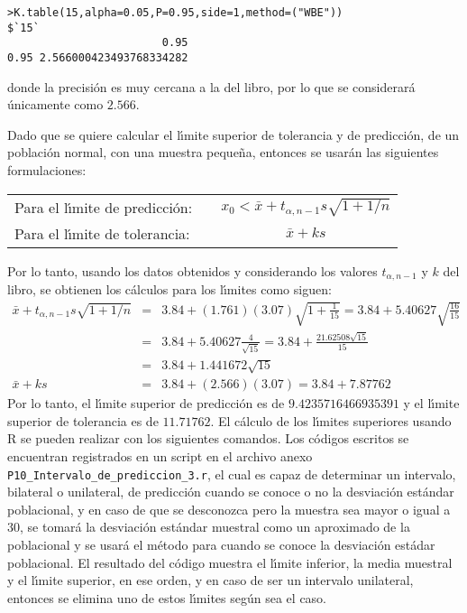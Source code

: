 \begin{solucion}
\begin{verbatim}
>K.table(15,alpha=0.05,P=0.95,side=1,method=("WBE"))
$`15`
                        0.95
0.95 2.566000423493768334282
 \end{verbatim}
 \vspace{-0.5cm}
 donde la precisi\'on es muy cercana a la del libro, por lo que se considerar\'a \'unicamente como $2.566$.
 \par
 Dado que se quiere calcular el l\'{\i}mite superior de tolerancia y de predicci\'on, de un poblaci\'on normal, con una muestra peque\~na, entonces se usar\'an las siguientes formulaciones:
 \begin{center}
  \begin{tabular}{lcc}
   Para el l\'{\i}mite de predicci\'on: & \hspace{1cm} & $x_0 < \bar{x} + t_{\alpha,n-1}s\sqrt{1+1/n}$ \\
   Para el l\'{\i}mite de tolerancia: & & $\bar{x} + ks$
  \end{tabular}
 \end{center}
 Por lo tanto, usando los datos obtenidos y considerando los valores $t_{\alpha,n-1}$ y $k$ del libro, se obtienen los c\'alculos para los l\'{\i}mites como siguen:
 \begin{eqnarray*}
  \bar{x}+ t_{\alpha,n-1}s\sqrt{1+1/n} & = & 3.84 + (1.761)(3.07)\sqrt{1+\frac{1}{15}} = 3.84 + 5.40627\sqrt{\frac{16}{15}} \\
  & = & 3.84 + 5.40627 \frac{4}{\sqrt{15}} = 3.84 + \frac{21.62508\sqrt{15}}{15} \\
  & = & 3.84 + 1.441672\sqrt{15} \\
  \bar{x} + ks & = & 3.84 + (2.566)(3.07) = 3.84 + 7.87762
 \end{eqnarray*}
 Por lo tanto, el l\'{\i}mite superior de predicci\'on es de $9.4235716466935391$ y el l\'{\i}mite superior de tolerancia es de $11.71762$. El c\'alculo de los l\'{\i}mites superiores usando R se pueden realizar con los siguientes comandos. Los c\'odigos escritos se encuentran registrados en un script en el archivo anexo \texttt{P10\_Intervalo\_de\_prediccion\_3.r}, el cual es capaz de determinar un intervalo, bilateral o unilateral, de predicci\'on cuando se conoce o no la desviaci\'on est\'andar poblacional, y en caso de que se desconozca pero la muestra sea mayor o igual a 30, se tomar\'a la desviaci\'on est\'andar muestral como un aproximado de la poblacional y se usar\'a el m\'etodo para cuando se conoce la desviaci\'on est\'adar poblacional. El resultado del c\'odigo muestra el l\'{\i}mite inferior, la media muestral y el l\'{\i}mite superior, en ese orden, y en caso de ser un intervalo unilateral, entonces se elimina uno de estos l\'{\i}mites seg\'un sea el caso.

\end{solucion}
